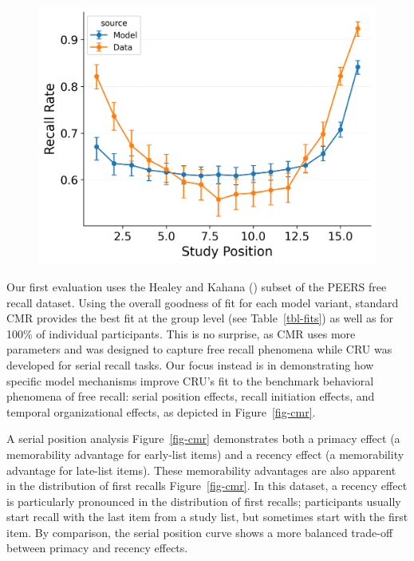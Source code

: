 \documentclass[
  man,
  floatsintext,
  longtable,
  nolmodern,
  notxfonts,
  notimes,
  draftfirst,
  colorlinks=true,linkcolor=blue,citecolor=blue,urlcolor=blue]{apa7}
\begin{document}
\begin{figure}
%
\begin{minipage}{0.33\linewidth}
\includegraphics{figures/HealeyKahana2014_BaseCMR_Fitting_spc.png}\end{minipage}%

\end{figure}%

Our first evaluation uses the Healey and Kahana
() subset of the PEERS free recall
dataset. Using the overall goodness of fit for each model variant,
standard CMR provides the best fit at the group level (see
Table~\ref{tbl-fits}) as well as for 100\% of individual participants.
This is no surprise, as CMR uses more parameters and was designed to
capture free recall phenomena while CRU was developed for serial recall
tasks. Our focus instead is in demonstrating how specific model
mechanisms improve CRU's fit to the benchmark behavioral phenomena of
free recall: serial position effects, recall initiation effects, and
temporal organizational effects, as depicted in Figure~\ref{fig-cmr}.

A serial position analysis Figure~\ref{fig-cmr} demonstrates both a
primacy effect (a memorability advantage for early-list items) and a
recency effect (a memorability advantage for late-list items). These
memorability advantages are also apparent in the distribution of first
recalls Figure~\ref{fig-cmr}. In this dataset, a recency effect is
particularly pronounced in the distribution of first recalls;
participants usually start recall with the last item from a study list,
but sometimes start with the first item. By comparison, the serial
position curve shows a more balanced trade-off between primacy and
recency effects.
\end{document}
